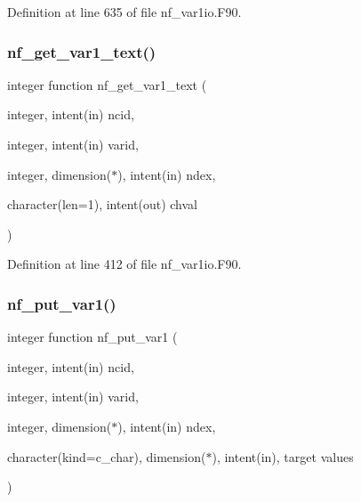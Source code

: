 Definition at line 635 of file nf\+\_\+var1io.\+F90.

\mbox{\label{nf__var1io_8F90_a8f940e36d194bd3eec9616d971a19294}} 
\subsubsection{\texorpdfstring{nf\+\_\+get\+\_\+var1\+\_\+text()}{nf\_get\_var1\_text()}}
{\footnotesize\ttfamily integer function nf\+\_\+get\+\_\+var1\+\_\+text (\begin{DoxyParamCaption}\item[{integer, intent(in)}]{ncid,  }\item[{integer, intent(in)}]{varid,  }\item[{integer, dimension($\ast$), intent(in)}]{ndex,  }\item[{character(len=1), intent(out)}]{chval }\end{DoxyParamCaption})}



Definition at line 412 of file nf\+\_\+var1io.\+F90.

\mbox{\label{nf__var1io_8F90_a9ddfd74a7307054bff4eb442de94e43e}} 
\subsubsection{\texorpdfstring{nf\+\_\+put\+\_\+var1()}{nf\_put\_var1()}}
{\footnotesize\ttfamily integer function nf\+\_\+put\+\_\+var1 (\begin{DoxyParamCaption}\item[{integer, intent(in)}]{ncid,  }\item[{integer, intent(in)}]{varid,  }\item[{integer, dimension($\ast$), intent(in)}]{ndex,  }\item[{character(kind=c\+\_\+char), dimension($\ast$), intent(in), target}]{values }\end{DoxyParamCaption})}



